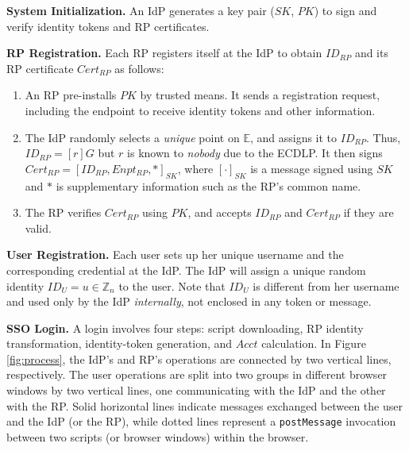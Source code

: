 \noindent \textbf{System Initialization.}
An IdP generates a key pair ($SK$, $PK$) to sign and verify identity tokens and RP certificates.

\vspace{1mm}
\noindent\textbf{RP Registration.}
Each RP registers itself at the IdP to obtain $ID_{RP}$ and its RP certificate $Cert_{RP}$ as follows:
\vspace{-\topsep}\begin{enumerate}
\setlength{\topsep}{0pt}
\setlength{\partopsep}{0pt}
\setlength{\itemsep}{0pt}
\setlength{\parsep}{0pt}
\setlength{\parskip}{0pt}
\item
An RP pre-installs $PK$ by trusted means.
It sends a registration request, including the endpoint to receive identity tokens and other information.
\item
The IdP randomly selects a \emph{unique} point on $\mathbb{E}$,
        and assigns it to $ID_{RP}$.
Thus, $ID_{RP} = [r]G$ but $r$ is known to \emph{nobody} due to the ECDLP.
It then signs $Cert_{RP} = [ID_{RP}, Enpt_{RP}, *]_{SK}$,
     where $[\cdot]_{SK}$ is a message signed using $SK$ and $*$ is supplementary information such as the RP's common name.
\item
The RP verifies $Cert_{RP}$ using $PK$, and accepts $ID_{RP}$ and $Cert_{RP}$ if they are valid.
\end{enumerate}


\noindent\textbf{User Registration.}
Each user sets up her unique username and the corresponding credential at the IdP.
The IdP will assign
a unique random identity $ID_U = u \in \mathbb{Z}_n$ to the user.
Note that $ID_U$ is different from her username and used only by the IdP \emph{internally},
 not enclosed in any token or message.


\vspace{1mm}
\noindent\textbf{SSO Login.} A login %
involves four steps: script downloading, RP identity transformation, identity-token generation, and $Acct$ calculation. In Figure \ref{fig:process}, the IdP's and RP's operations are connected by two vertical lines, respectively. The user operations are split into two groups in different browser windows by two vertical lines, one communicating with the IdP and the other with the RP. Solid horizontal lines indicate messages exchanged between the user and the IdP (or the RP), while dotted lines represent a \verb+postMessage+ invocation between two scripts (or browser windows) within the browser.


